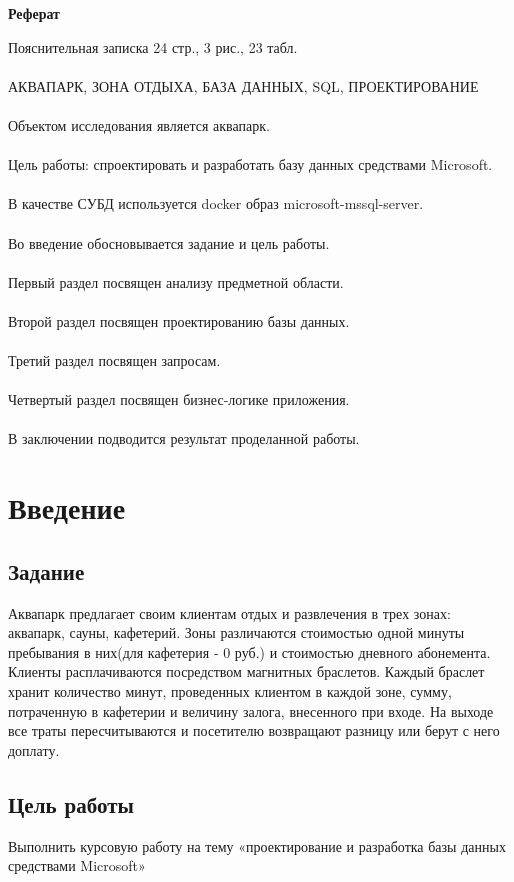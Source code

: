 \documentclass[a4paper]{article}
\begin{document}
\pagebreak
\begin{center}
	\LARGE
	\textbf{Реферат}
\end{center}
	Пояснительная записка 24 стр., 3 рис., 23 табл. \\ \\
	АКВАПАРК, ЗОНА ОТДЫХА, БАЗА ДАННЫХ, SQL, ПРОЕКТИРОВАНИЕ \\ \\ 
	Объектом исследования является аквапарк. \\ \\ 
	Цель работы: спроектировать и разработать базу данных средствами Microsoft. \\ \\ 
	В качестве СУБД используется docker образ microsoft-mssql-server. \\ \\
	Во введение обосновывается задание и цель работы. \\ \\
	Первый раздел посвящен анализу предметной области. \\ \\ 
	Второй раздел посвящен проектированию базы данных. \\ \\
	Третий раздел посвящен запросам. \\ \\
	Четвертый раздел посвящен бизнес-логике приложения. \\ \\
	В заключении подводится результат проделанной работы.

\pagebreak
\tableofcontents
\pagebreak

\section{Введение}
\subsection{Задание}
Аквапарк предлагает своим клиентам отдых и развлечения в трех зонах: аквапарк, сауны, кафетерий.
Зоны различаются стоимостью одной минуты пребывания в них(для кафетерия - 0 руб.) и стоимостью дневного абонемента.
Клиенты расплачиваются посредством магнитных браслетов. 
Каждый браслет хранит количество минут, проведенных клиентом в каждой зоне, сумму, 
потраченную в кафетерии и величину залога, внесенного при входе.
На выходе все траты пересчитываются и посетителю возвращают разницу или берут с него доплату.
\subsection{Цель работы}
Выполнить курсовую работу на тему «проектирование и разработка базы
данных средствами Microsoft»
\end{document}
